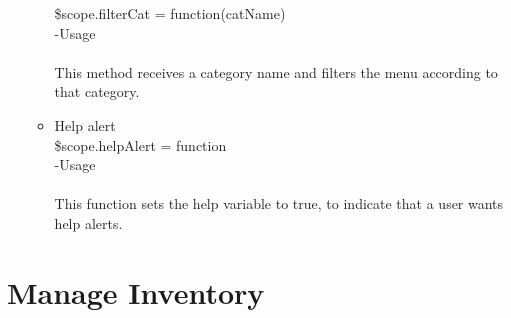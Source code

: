 \documentclass[a4paper,12pt]{report}
\begin{document}
\begin{enumerate}
\begin{itemize}
		\$scope.filterCat = function(catName)\\
		-Usage\\ \\
		This method receives a category name and filters the menu according to that category.
		\item Help alert\\
		\$scope.helpAlert = function\\
		-Usage\\ \\
		This function sets the help variable to true, to indicate that a user wants help alerts.
	\end{itemize}
	
\end{enumerate}
\section{Manage Inventory}
\end{document}
